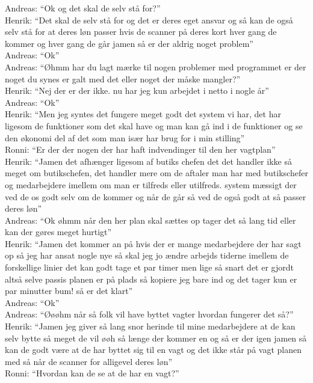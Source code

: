 Andreas: “Ok og det skal de selv stå for?”\\
Henrik: “Det skal de selv stå for og det er deres eget ansvar og så kan de også selv stå for at deres løn passer hvis de scanner på deres kort hver gang de kommer og hver gang de går jamen så er der aldrig noget problem”\\
Andreas: “Ok”\\
Andreas: “Øhmm har du lagt mærke til nogen problemer med programmet er der noget du synes er galt med det eller noget der måske mangler?”\\
Henrik: “Nej der er der ikke. nu har jeg kun arbejdet i netto i nogle år”\\
Andreas: “Ok”\\
Henrik: “Men jeg syntes det fungere meget godt det system vi har, det har ligesom de funktioner som det skal have og man kan gå ind i de funktioner og se den økonomi del af det som man især har brug for i min stilling”\\
Ronni: “Er der der nogen der har haft indvendinger til den her vagtplan”\\
Henrik: “Jamen det afhænger ligesom af butiks chefen det det handler ikke så meget om butikschefen, det handler mere om de aftaler man har med butikschefer og medarbejdere imellem om man er tilfreds eller utilfreds. system mæssigt der ved de os godt selv om de kommer og når de går så ved de også godt at så passer deres løn”\\
Andreas: “Ok øhmm når den her plan skal sættes op tager det så lang tid eller kan der gøres meget hurtigt”\\
Henrik: “Jamen det kommer an på hvis der er mange medarbejdere der har sagt op så jeg har ansat nogle nye så skal jeg jo ændre arbejds tiderne imellem de forskellige linier det kan godt tage et par timer men lige så snart det er gjordt altså selve passis planen er på plads så kopiere jeg bare ind og det tager kun er par minutter bum! så er det klart”\\
Andreas: “Ok”\\
Andreas: “Øøøhm når så folk vil have byttet vagter hvordan fungerer det så?”\\
Henrik: “Jamen jeg giver så lang snor herinde til mine medarbejdere at de kan selv bytte så meget de vil øøh så længe der kommer en og så er der igen jamen så kan de godt være at de har byttet sig til en vagt og det ikke står på vagt planen med så når de scanner for alligevel deres løn”\\
Ronni: “Hvordan kan de se at de har en vagt?”\\
